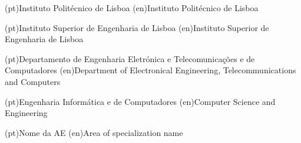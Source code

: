 
%



\ncuniversity*(pt){Instituto Politécnico de Lisboa}
\ncuniversity*(en){Instituto Politécnico de Lisboa}

\ncschool*(pt){Instituto Superior de Engenharia de Lisboa}
\ncschool*(en){Instituto Superior de Engenharia de Lisboa}

\ncdepartment*(pt){Departamento de Engenharia Eletrónica e Telecomunicações e de Computadores}
\ncdepartment*(en){Department of Electronical Engineering, Telecommunications and Computers}



\ncmajorfield(pt){Engenharia Informática e de Computadores}
\ncmajorfield(en){Computer Science and Engineering}




\ncspecialization(pt){Nome da AE}
\ncspecialization(en){Area of specialization name}
